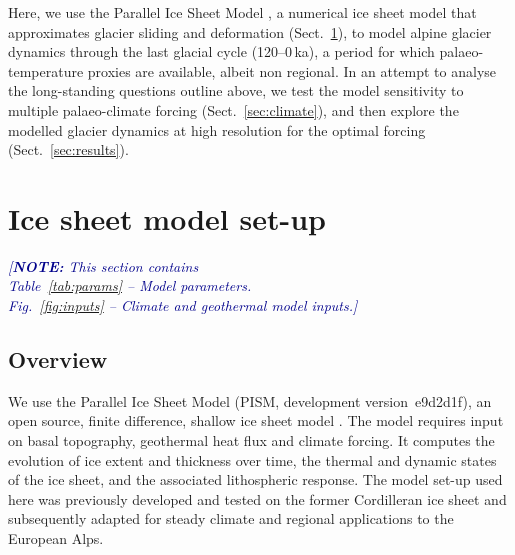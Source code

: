 \documentclass[tc, manuscript]{copernicus}
\newcommand{\note}[1]{\textcolor{darkblue}{\emph{[\textbf{NOTE:} #1]}}}
\begin{document}
    Here, we use the Parallel Ice Sheet Model
    \citep[PISM,][]{PISM-authors.2017}, a numerical ice sheet model that
    approximates glacier sliding and deformation (Sect.~\ref{sec:model}), to
    model alpine glacier dynamics through the last glacial cycle (120--0\,ka),
    a period for which palaeo-temperature proxies are available, albeit non
    regional. In an attempt to analyse the long-standing questions outline
    above, we test the model sensitivity to multiple palaeo-climate forcing
    (Sect.~\ref{sec:climate}), and then explore the modelled glacier dynamics
    at high resolution for the optimal forcing (Sect.~\ref{sec:results}).


\section{Ice sheet model set-up}
\label{sec:model}

    \note{This section contains\\
        Table~\ref{tab:params} -- Model parameters.\\
        Fig.~\ref{fig:inputs} -- Climate and geothermal model inputs.}


\subsection{Overview}
\label{sec:overview}

    We use the Parallel Ice Sheet Model (PISM, development version~e9d2d1f), an
    open source, finite difference, shallow ice sheet model
    \citep{PISM-authors.2017}. The model requires input on basal
    topography, geothermal heat flux and climate forcing. It computes the
    evolution of ice extent and thickness over time, the thermal and dynamic
    states of the ice sheet, and the associated lithospheric response. The
    model set-up used here was previously developed and tested on the former
    Cordilleran ice sheet \citep{Seguinot.2014, Seguinot.etal.2014,
    Seguinot.etal.2016} and subsequently adapted for steady climate
    \citep{Becker.etal.2016} and regional \citep{Jouvet.etal.2017a,
    Cohen.etal.2017} applications to the European Alps.
\end{document}
